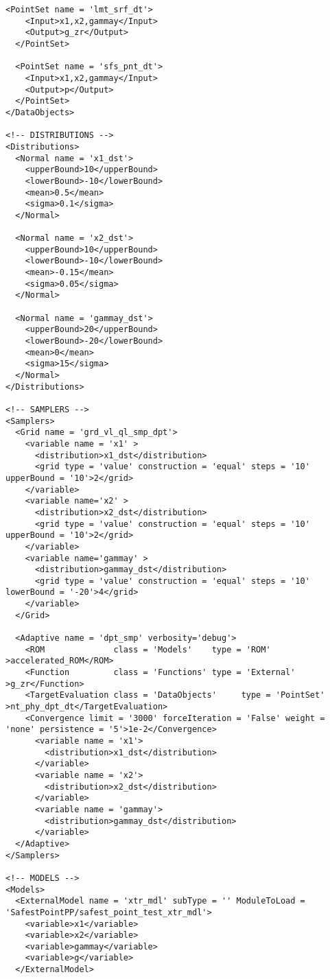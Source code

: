 \begin{lstlisting}[style=XML,morekeywords={debug,re,seeding,class,subType,limit}]
  <PointSet name = 'lmt_srf_dt'>
    <Input>x1,x2,gammay</Input>
    <Output>g_zr</Output>
  </PointSet>

  <PointSet name = 'sfs_pnt_dt'>
    <Input>x1,x2,gammay</Input>
    <Output>p</Output>
  </PointSet>
</DataObjects>

<!-- DISTRIBUTIONS -->
<Distributions>
  <Normal name = 'x1_dst'>
    <upperBound>10</upperBound>
    <lowerBound>-10</lowerBound>
  	<mean>0.5</mean>
    <sigma>0.1</sigma>
  </Normal>

  <Normal name = 'x2_dst'>
    <upperBound>10</upperBound>
    <lowerBound>-10</lowerBound>
    <mean>-0.15</mean>
    <sigma>0.05</sigma>
  </Normal>

  <Normal name = 'gammay_dst'>
    <upperBound>20</upperBound>
    <lowerBound>-20</lowerBound>
    <mean>0</mean>
    <sigma>15</sigma>
  </Normal>
</Distributions>

<!-- SAMPLERS -->
<Samplers>
  <Grid name = 'grd_vl_ql_smp_dpt'>
    <variable name = 'x1' >
      <distribution>x1_dst</distribution>
      <grid type = 'value' construction = 'equal' steps = '10' upperBound = '10'>2</grid>
    </variable>
    <variable name='x2' >
      <distribution>x2_dst</distribution>
      <grid type = 'value' construction = 'equal' steps = '10' upperBound = '10'>2</grid>
    </variable>
    <variable name='gammay' >
      <distribution>gammay_dst</distribution>
      <grid type = 'value' construction = 'equal' steps = '10' lowerBound = '-20'>4</grid>
    </variable>
  </Grid>

  <Adaptive name = 'dpt_smp' verbosity='debug'>
    <ROM              class = 'Models'    type = 'ROM'           >accelerated_ROM</ROM>
    <Function         class = 'Functions' type = 'External'      >g_zr</Function>
    <TargetEvaluation class = 'DataObjects'     type = 'PointSet'  >nt_phy_dpt_dt</TargetEvaluation>
    <Convergence limit = '3000' forceIteration = 'False' weight = 'none' persistence = '5'>1e-2</Convergence>
      <variable name = 'x1'>
        <distribution>x1_dst</distribution>
      </variable>
      <variable name = 'x2'>
        <distribution>x2_dst</distribution>
      </variable>
      <variable name = 'gammay'>
        <distribution>gammay_dst</distribution>
      </variable>
  </Adaptive>
</Samplers>

<!-- MODELS -->
<Models>
  <ExternalModel name = 'xtr_mdl' subType = '' ModuleToLoad = 'SafestPointPP/safest_point_test_xtr_mdl'>
    <variable>x1</variable>
    <variable>x2</variable>
    <variable>gammay</variable>
    <variable>g</variable>
  </ExternalModel>


\end{lstlisting}
